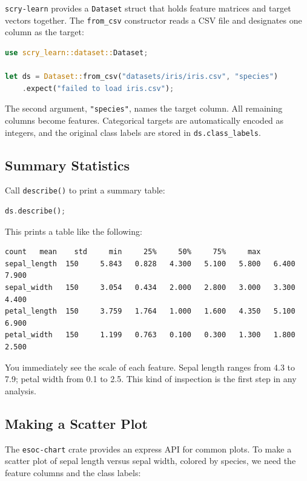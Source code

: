 \texttt{scry-learn} provides a \texttt{Dataset} struct that holds feature
matrices and target vectors together. The \texttt{from\_csv} constructor reads a
CSV file and designates one column as the target:

\begin{lstlisting}[language=rust]
use scry_learn::dataset::Dataset;

let ds = Dataset::from_csv("datasets/iris/iris.csv", "species")
    .expect("failed to load iris.csv");
\end{lstlisting}

The second argument, \texttt{"species"}, names the target column. All remaining
columns become features. Categorical targets are automatically encoded as
integers, and the original class labels are stored in
\texttt{ds.class\_labels}.

\subsection{Summary Statistics}

Call \texttt{describe()} to print a summary table:

\begin{lstlisting}[language=rust]
ds.describe();
\end{lstlisting}

This prints a table like the following:

\begin{lstlisting}[numbers=none]
              count   mean    std     min     25%     50%     75%     max
sepal_length  150     5.843   0.828   4.300   5.100   5.800   6.400   7.900
sepal_width   150     3.054   0.434   2.000   2.800   3.000   3.300   4.400
petal_length  150     3.759   1.764   1.000   1.600   4.350   5.100   6.900
petal_width   150     1.199   0.763   0.100   0.300   1.300   1.800   2.500
\end{lstlisting}

You immediately see the scale of each feature. Sepal length ranges from 4.3 to
7.9; petal width from 0.1 to 2.5. This kind of inspection is the first step in
any analysis.

\subsection{Making a Scatter Plot}

The \texttt{esoc-chart} crate provides an express API for common plots. To make
a scatter plot of sepal length versus sepal width, colored by species, we need
the feature columns and the class labels:

